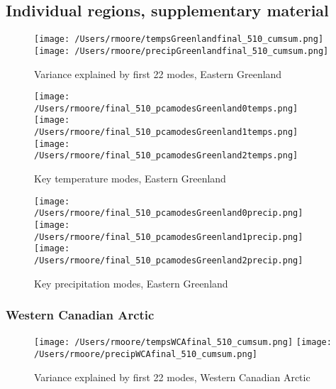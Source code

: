 \documentclass[11pt, oneside]{article}
\begin{document}
        \subsection{Individual regions, supplementary material }

\begin{figure}[!htb]
    \centering
    \centering
      \texttt{[image: /Users/rmoore/tempsGreenlandfinal\_510\_cumsum.png]}
    \endminipage
    \centering
      \texttt{[image: /Users/rmoore/precipGreenlandfinal\_510\_cumsum.png]}
    \endminipage
    \caption{Variance explained by first 22 modes, Eastern Greenland}\label{PCA_cumsum_green}
    \end{figure}

\begin{figure}[!htb]
    \centering
      \texttt{[image: /Users/rmoore/final\_510\_pcamodesGreenland0temps.png]}
    \endminipage 
    \\
      \texttt{[image: /Users/rmoore/final\_510\_pcamodesGreenland1temps.png]}
    \endminipage
    \\
      \texttt{[image: /Users/rmoore/final\_510\_pcamodesGreenland2temps.png]}
    \endminipage
    \caption{Key temperature modes, Eastern Greenland}\label{pca_temp_green}
    \end{figure}

    \begin{figure}[!htb]
        \centering
          \texttt{[image: /Users/rmoore/final\_510\_pcamodesGreenland0precip.png]}
        \endminipage 
        \\
          \texttt{[image: /Users/rmoore/final\_510\_pcamodesGreenland1precip.png]}
        \endminipage
        \\
          \texttt{[image: /Users/rmoore/final\_510\_pcamodesGreenland2precip.png]}
        \endminipage
        \caption{Key precipitation modes, Eastern Greenland}\label{pca_precip_green}
        \end{figure}


        \subsubsection{Western Canadian Arctic}
\begin{figure}[!htb]
    \centering
    \centering
      \texttt{[image: /Users/rmoore/tempsWCAfinal\_510\_cumsum.png]}
    \endminipage
    \centering
      \texttt{[image: /Users/rmoore/precipWCAfinal\_510\_cumsum.png]}
    \endminipage
    \caption{Variance explained by first 22 modes, Western Canadian Arctic}\label{PCA_cumsum_WCA}
    \end{figure}
\end{document}
